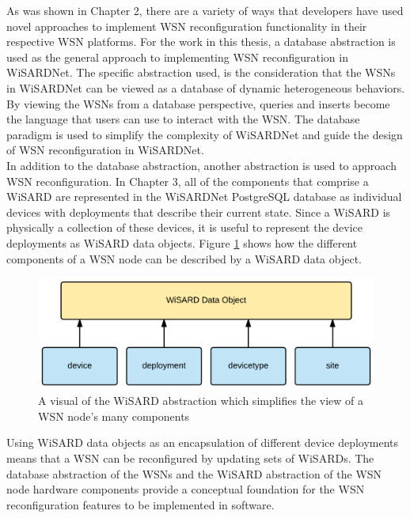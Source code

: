 As was shown in Chapter 2, there are a variety of ways that developers have used novel approaches to implement WSN reconfiguration functionality in their respective WSN platforms. For the work in this thesis, a database abstraction is used as the general approach to implementing WSN reconfiguration in WiSARDNet. The specific abstraction used, is the consideration that the WSNs in WiSARDNet can be viewed as a database of dynamic heterogeneous behaviors. By viewing the WSNs from a database perspective, queries and inserts become the language that users can use to interact with the WSN. The database paradigm is used to simplify the complexity of WiSARDNet and guide the design of WSN reconfiguration in WiSARDNet.\\

In addition to the database abstraction, another abstraction is used to approach WSN reconfiguration. In Chapter 3, all of the components that comprise a WiSARD are represented in the WiSARDNet PostgreSQL database as individual devices with deployments that describe their current state. Since a WiSARD is physically a collection of these devices, it is useful to represent the device deployments as WiSARD data objects. Figure \ref{fig:wisard_object} shows how the different components of a WSN node  can be described by a WiSARD data object. 

\begin{figure}[H]
	\centering
	\includegraphics[width=\textwidth]{figures/wis_data_objects.png}
	\caption{A visual of the WiSARD abstraction which simplifies the view of a WSN node's many components}
	\label{fig:wisard_object}
\end{figure}

Using WiSARD data objects as an encapsulation of different device deployments means that a WSN can be reconfigured by updating sets of WiSARDs. The database abstraction of the WSNs and the WiSARD abstraction of the WSN node hardware components provide a conceptual foundation for the WSN reconfiguration features to be implemented in software.


